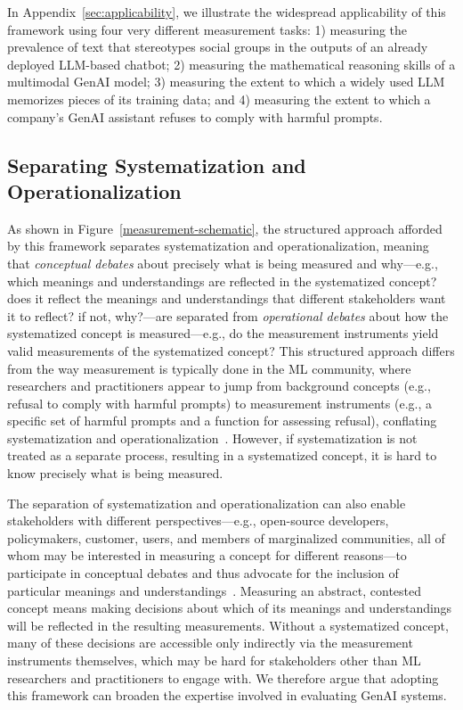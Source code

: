 \documentclass{article}
\begin{document}
In Appendix~\ref{sec:applicability}, we illustrate the widespread applicability of this framework using 
four very different measurement tasks: 1)  measuring the prevalence of text that stereotypes social groups in the outputs of an already deployed LLM-based chatbot; 2) measuring the mathematical reasoning skills of a multimodal GenAI model; 3) measuring the extent to which a widely used LLM memorizes pieces of its training data; and 4) measuring the extent to which a company's GenAI assistant refuses to comply with harmful prompts.

\subsection{Separating Systematization and Operationalization}

As shown in Figure~\ref{measurement-schematic}, the structured approach afforded by this framework separates systematization and operationalization, meaning that \emph{conceptual debates} about precisely what is being measured and why---e.g., which meanings and understandings are reflected in the systematized concept? does it reflect the meanings and understandings that different stakeholders want it to reflect? if not, why?---are separated from \emph{operational debates} about how the systematized concept is measured---e.g., do the measurement instruments yield valid measurements of the systematized concept? This structured approach differs from the way measurement is typically done in the ML community,
where researchers and practitioners appear to jump from background concepts (e.g., 
refusal to comply with harmful prompts) to measurement instruments (e.g., a specific set of harmful prompts and a function for assessing refusal), 
conflating systematization and operationalization~\citep[e.g.,][]{blilihamelin2023intelligence, cooper2021emergent, jacobs2021measurement, blodgett2020language,EBCD}. 
However, if systematization is not treated as a separate process, resulting in a systematized concept, it is hard to know precisely what is being measured. 

The separation of systematization and operationalization can also enable stakeholders with different perspectives---e.g., open-source developers, policymakers, customer, users, and members of marginalized communities, all of whom may be interested in measuring a concept for different reasons---to participate in conceptual debates and thus advocate for the inclusion of particular meanings and understandings~\citep{abebe2020roles}. Measuring an abstract, contested concept means making decisions about which of its meanings and understandings will be reflected in the resulting measurements. Without a systematized concept, many of these decisions are accessible only indirectly via the measurement instruments themselves, which may be hard for stakeholders other than ML researchers and practitioners to engage with. We therefore argue that adopting this framework can broaden the expertise involved in evaluating GenAI systems.
\end{document}
